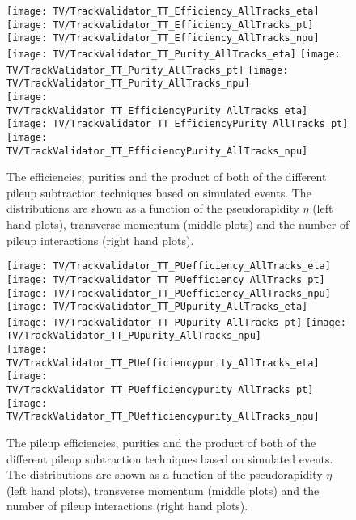 \begin{figure}[Ht]
    \centering
    \texttt{[image: TV/TrackValidator\_TT\_Efficiency\_AllTracks\_eta]}
    \texttt{[image: TV/TrackValidator\_TT\_Efficiency\_AllTracks\_pt]}
    \texttt{[image: TV/TrackValidator\_TT\_Efficiency\_AllTracks\_npu]}
    \\
    \texttt{[image: TV/TrackValidator\_TT\_Purity\_AllTracks\_eta]}
    \texttt{[image: TV/TrackValidator\_TT\_Purity\_AllTracks\_pt]}
    \texttt{[image: TV/TrackValidator\_TT\_Purity\_AllTracks\_npu]}
    \\
    \texttt{[image: TV/TrackValidator\_TT\_EfficiencyPurity\_AllTracks\_eta]}
    \texttt{[image: TV/TrackValidator\_TT\_EfficiencyPurity\_AllTracks\_pt]}
    \texttt{[image: TV/TrackValidator\_TT\_EfficiencyPurity\_AllTracks\_npu]}
    \caption[Efficiencies, purities and their product of the different pileup subtraction techniques based on simulated \ttbar events]{The efficiencies, purities and the product of both of the different pileup subtraction techniques based on simulated \ttbar events. The distributions are shown as a function of the pseudorapidity $\eta$ (left hand plots), transverse momentum (middle plots) and the number of pileup interactions (right hand plots). \label{plot:TACOAACPTTSignal}}
\end{figure}

\begin{figure}[Ht]
    \centering
    \texttt{[image: TV/TrackValidator\_TT\_PUefficiency\_AllTracks\_eta]}
    \texttt{[image: TV/TrackValidator\_TT\_PUefficiency\_AllTracks\_pt]}
    \texttt{[image: TV/TrackValidator\_TT\_PUefficiency\_AllTracks\_npu]}
    \\
    \texttt{[image: TV/TrackValidator\_TT\_PUpurity\_AllTracks\_eta]}
    \texttt{[image: TV/TrackValidator\_TT\_PUpurity\_AllTracks\_pt]}
    \texttt{[image: TV/TrackValidator\_TT\_PUpurity\_AllTracks\_npu]}
    \\
    \texttt{[image: TV/TrackValidator\_TT\_PUefficiencypurity\_AllTracks\_eta]}
    \texttt{[image: TV/TrackValidator\_TT\_PUefficiencypurity\_AllTracks\_pt]}
    \texttt{[image: TV/TrackValidator\_TT\_PUefficiencypurity\_AllTracks\_npu]}
    \caption[Pileup efficiencies, purities and their product of the different pileup subtraction techniques based on simulated \ttbar events]{The pileup efficiencies, purities and the product of both of the different pileup subtraction techniques based on simulated \ttbar events. The distributions are shown as a function of the pseudorapidity $\eta$ (left hand plots), transverse momentum (middle plots) and the number of pileup interactions (right hand plots). \label{plot:TACOAACPTTPileup}}
\end{figure}


